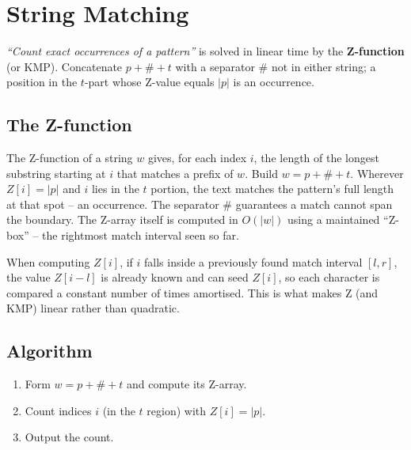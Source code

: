 \section{String Matching}
\label{sec:cses-string-matching}


\begin{patternbox}
\emph{``Count exact occurrences of a pattern''} is solved in linear time
by the \textbf{Z-function} (or KMP). Concatenate $p+\#+t$ with a separator
$\#$ not in either string; a position in the $t$-part whose Z-value equals
$|p|$ is an occurrence.
\end{patternbox}

\subsection*{The Z-function}

The Z-function of a string $w$ gives, for each index $i$, the length of the
longest substring starting at $i$ that matches a prefix of $w$. Build
$w=p+\#+t$. Wherever $Z[i]=|p|$ and $i$ lies in the $t$ portion, the text
matches the pattern's full length at that spot -- an occurrence. The
separator $\#$ guarantees a match cannot span the boundary. The Z-array
itself is computed in $O(|w|)$ using a maintained ``Z-box'' -- the
rightmost match interval seen so far.

\begin{ideabox}
When computing $Z[i]$, if $i$ falls inside a previously found match
interval $[l,r]$, the value $Z[i-l]$ is already known and can seed
$Z[i]$, so each character is compared a constant number of times
amortised. This is what makes Z (and KMP) linear rather than quadratic.
\end{ideabox}

\subsection*{Algorithm}

\begin{enumerate}
  \item Form $w=p+\#+t$ and compute its Z-array.
  \item Count indices $i$ (in the $t$ region) with $Z[i]=|p|$.
  \item Output the count.
\end{enumerate}

